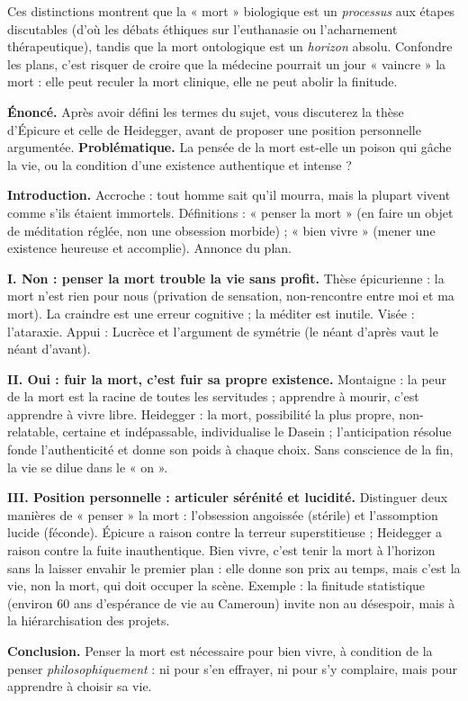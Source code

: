 \documentclass[11pt]{article}
\begin{document}
Ces distinctions montrent que la « mort » biologique est un \emph{processus} aux étapes discutables (d'où les débats éthiques sur l'euthanasie ou l'acharnement thérapeutique), tandis que la mort ontologique est un \emph{horizon} absolu. Confondre les plans, c'est risquer de croire que la médecine pourrait un jour « vaincre » la mort : elle peut reculer la mort clinique, elle ne peut abolir la finitude.

\begin{exoresolu}
\textbf{Énoncé.} Après avoir défini les termes du sujet, vous discuterez la thèse d'Épicure et celle de Heidegger, avant de proposer une position personnelle argumentée.
\tcblower
\textbf{Problématique.} La pensée de la mort est-elle un poison qui gâche la vie, ou la condition d'une existence authentique et intense ?

\textbf{Introduction.} Accroche : tout homme sait qu'il mourra, mais la plupart vivent comme s'ils étaient immortels. Définitions : « penser la mort » (en faire un objet de méditation réglée, non une obsession morbide) ; « bien vivre » (mener une existence heureuse et accomplie). Annonce du plan.

\textbf{I. Non : penser la mort trouble la vie sans profit.} Thèse épicurienne : la mort n'est rien pour nous (privation de sensation, non-rencontre entre moi et ma mort). La craindre est une erreur cognitive ; la méditer est inutile. Visée : l'ataraxie. Appui : Lucrèce et l'argument de symétrie (le néant d'après vaut le néant d'avant).

\textbf{II. Oui : fuir la mort, c'est fuir sa propre existence.} Montaigne : la peur de la mort est la racine de toutes les servitudes ; apprendre à mourir, c'est apprendre à vivre libre. Heidegger : la mort, possibilité la plus propre, non-relatable, certaine et indépassable, individualise le Dasein ; l'anticipation résolue fonde l'authenticité et donne son poids à chaque choix. Sans conscience de la fin, la vie se dilue dans le « on ».

\textbf{III. Position personnelle : articuler sérénité et lucidité.} Distinguer deux manières de « penser » la mort : l'obsession angoissée (stérile) et l'assomption lucide (féconde). Épicure a raison contre la terreur superstitieuse ; Heidegger a raison contre la fuite inauthentique. Bien vivre, c'est tenir la mort à l'horizon sans la laisser envahir le premier plan : elle donne son prix au temps, mais c'est la vie, non la mort, qui doit occuper la scène. Exemple : la finitude statistique (environ 60 ans d'espérance de vie au Cameroun) invite non au désespoir, mais à la hiérarchisation des projets.

\textbf{Conclusion.} Penser la mort est nécessaire pour bien vivre, à condition de la penser \emph{philosophiquement} : ni pour s'en effrayer, ni pour s'y complaire, mais pour apprendre à choisir sa vie.
\end{exoresolu}
\end{document}
